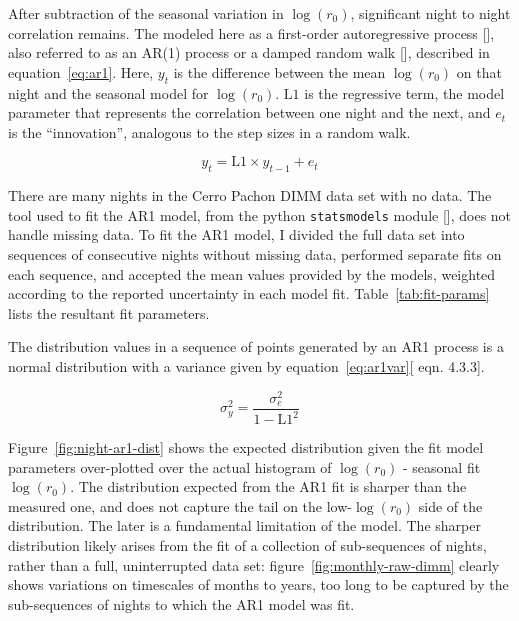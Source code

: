 \documentclass[\docopts]{\docclass}
\begin{document}
After subtraction of the seasonal variation in $\log(r_0)$,
significant night to night correlation remains. The modeled here as a
first-order autoregressive process [\cite{cryer_time_2008}], also
referred to as an AR(1) process or a damped random walk
[\cite{2009ApJ...698..895K}], described in
equation~\ref{eq:ar1}. Here, $y_t$ is the difference between the mean
$\log(r_0)$ on that night and the seasonal model for
$\log(r_0)$. $\mbox{L1}$ is the regressive term, the model parameter
that represents the correlation between one night and the next, and
$e_t$ is the ``innovation'', analogous to the step sizes in a random
walk.

\begin{equation} \label{eq:ar1}
y_t = \mbox{L1} \times y_{t-1} + e_t
\end{equation}

There are many nights in the Cerro Pachon DIMM data set with no data.
The tool used to fit the AR1 model, from the python
\texttt{statsmodels} module [\cite{seabold2010statsmodels}], does not
handle missing data. To fit the AR1 model, I divided the full data set
into sequences of consecutive nights without missing data, performed
separate fits on each sequence, and accepted the mean values provided
by the models, weighted according to the reported uncertainty in each
model fit. Table~\ref{tab:fit-params} lists the resultant fit
parameters.

The distribution values in a sequence of points generated by an AR1
process is a normal distribution with a variance given by
equation~\ref{eq:ar1var}[\cite{cryer_time_2008} eqn. 4.3.3].

\begin{equation} \label{eq:ar1var}
\sigma_y^2 = \frac{\sigma_e^2}{1-\mbox{L1}^2}
\end{equation}

Figure~\ref{fig:night-ar1-dist} shows the expected distribution given
the fit model parameters over-plotted over the actual histogram of
$\log(r_0)$ - seasonal fit $\log(r_0)$. The distribution expected from
the AR1 fit is sharper than the measured one, and does not capture the
tail on the low-$\log(r_0)$ side of the distribution. The later is a
fundamental limitation of the model. The sharper distribution likely
arises from the fit of a collection of sub-sequences of nights, rather
than a full, uninterrupted data set: figure~\ref{fig:monthly-raw-dimm}
clearly shows variations on timescales of months to years, too long to
be captured by the sub-sequences of nights to which the AR1 model was
fit.
\end{document}
